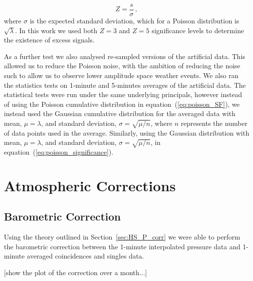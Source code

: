 \begin{equation}
Z = \frac{s}{\sigma} \, ,
\label{eq:poisson_significance}
\end{equation}
%
where $\sigma$ is the expected standard deviation, which for a Poisson distribution is $\sqrt{\lambda}$. In this work we used both $Z = 3$ and $Z = 5$ significance levels to determine the existence of excess signals.

As a further test we also analysed re-sampled versions of the artificial data. This allowed us to reduce the Poisson noise, with the ambition of reducing the noise such to allow us to observe lower amplitude space weather events. We also ran the statistics tests on 1-minute and 5-minutes averages of the artificial data. The statistical tests were run under the same underlying principals, however instead of using the Poisson cumulative distribution in equation~(\ref{eq:poisson_SF}), we instead used the Gaussian cumulative distribution for the averaged data with mean, $\mu = \lambda$, and standard deviation, $\sigma = \sqrt{\mu/n}$, where $n$ represents the number of data points used in the average. Similarly, using the Gaussian distribution with mean, $\mu = \lambda$, and  standard deviation, $\sigma = \sqrt{\mu/n}$, in equation~(\ref{eq:poisson_significance}).



\section{Atmospheric Corrections}\label{sec:HS_14008_atmospheric_correction}

\subsection{Barometric Correction}\label{sec:HS_14008_P_corr}


Using the theory outlined in Section~\ref{sec:HS_P_corr} we were able to perform the barometric correction between the 1-minute interpolated pressure data and 1-minute averaged coincidences and singles data.

[show the plot of the correction over a month...]


